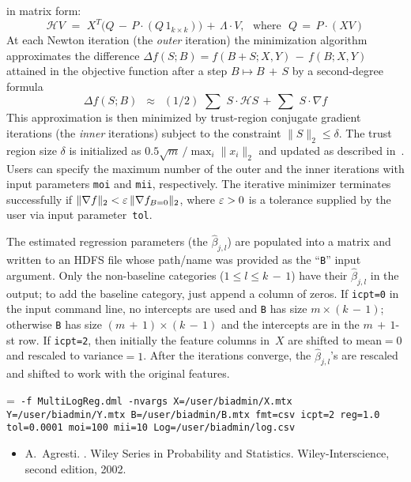 in matrix form:
\begin{equation*}
\mathcal{H}V \,\,=\,\, X^T \big( Q \,-\, P \cdot (Q\,1_{k\times k}) \big) \,+\,
\Lambda \cdot V, \,\,\,\,\textrm{where}\,\,\,\,Q \,=\, P \cdot (XV)
\end{equation*}
At each Newton iteration (the \emph{outer} iteration) the minimization algorithm
approximates the difference $\varDelta f(S; B) = f(B + S; X, Y) \,-\, f(B; X, Y)$
attained in the objective function after a step $B \mapsto B\,{+}\,S$ by a
second-degree formula
\begin{equation*}
\varDelta f(S; B) \,\,\,\approx\,\,\, (1/2)\,\,{\textstyle\sum}\,\,S \cdot \mathcal{H}S
 \,+\, {\textstyle\sum}\,\,S\cdot \nabla f
\end{equation*}
This approximation is then minimized by trust-region conjugate gradient iterations
(the \emph{inner} iterations) subject to the constraint $\|S\|_2 \leq \delta$.
The trust region size $\delta$ is initialized as $0.5\sqrt{m}\,/ \max\nolimits_i \|x_i\|_2$
and updated as described in~\cite{Lin2008:logistic}.
Users can specify the maximum number of the outer and the inner iterations with
input parameters {\tt moi} and {\tt mii}, respectively.  The iterative minimizer
terminates successfully if $\|\nabla f\|_2 < \varepsilon\,\|\nabla f_{B=0}\|_2$,
where $\varepsilon > 0$ is a tolerance supplied by the user via input parameter~{\tt tol}.

\smallskip
{}
\smallskip

The estimated regression parameters (the $\hat{\beta}_{j, l}$) are populated into
a matrix and written to an HDFS file whose path/name was provided as the ``{\tt B}''
input argument.  Only the non-baseline categories ($1\leq l \leq k\,{-}\,1$) have
their $\hat{\beta}_{j, l}$ in the output; to add the baseline category, just append
a column of zeros.  If {\tt icpt=0} in the input command line, no intercepts are used
and {\tt B} has size $m\times (k\,{-}\,1)$; otherwise {\tt B} has size 
$(m\,{+}\,1)\times (k\,{-}\,1)$
and the intercepts are in the $m\,{+}\,1$-st row.  If {\tt icpt=2}, then initially
the feature columns in~$X$ are shifted to mean${} = 0$ and rescaled to variance${} = 1$.
After the iterations converge, the $\hat{\beta}_{j, l}$'s are rescaled and shifted
to work with the original features.


\smallskip
{}
\smallskip

{\hangindent=\parindent\noindent\tt
\hml -f MultiLogReg.dml -nvargs X=/user/biadmin/X.mtx 
  Y=/user/biadmin/Y.mtx B=/user/biadmin/B.mtx fmt=csv
  icpt=2 reg=1.0 tol=0.0001 moi=100 mii=10 Log=/user/biadmin/log.csv

}


\smallskip
{}
\begin{itemize}
\item A.~Agresti.
.
\newblock Wiley Series in Probability and Statistics. Wiley-Interscience,  second edition, 2002.
\end{itemize}
